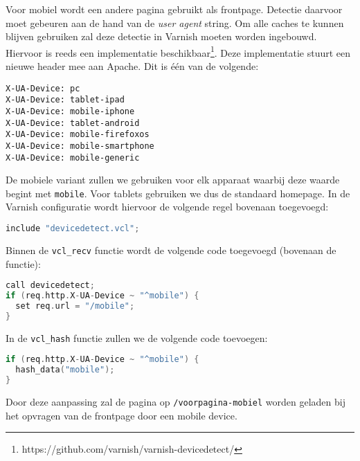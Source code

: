 Voor mobiel wordt een andere pagina gebruikt als frontpage. Detectie daarvoor moet gebeuren aan de hand van de \emph{user agent} string. Om alle caches te kunnen blijven gebruiken zal deze detectie in Varnish moeten worden ingebouwd. Hiervoor is reeds een implementatie beschikbaar\footnote{https://github.com/varnish/varnish-devicedetect/}. Deze implementatie stuurt een nieuwe header mee aan Apache. Dit is \'{e}\'{e}n van de volgende:
\begin{verbatim}
X-UA-Device: pc
X-UA-Device: tablet-ipad
X-UA-Device: mobile-iphone
X-UA-Device: tablet-android
X-UA-Device: mobile-firefoxos
X-UA-Device: mobile-smartphone
X-UA-Device: mobile-generic
\end{verbatim}
De mobiele variant zullen we gebruiken voor elk apparaat waarbij deze waarde begint met \texttt{mobile}. Voor tablets gebruiken we dus de standaard homepage. In de Varnish configuratie wordt hiervoor de volgende regel bovenaan toegevoegd:

\begin{lstlisting}[language=C]
include "devicedetect.vcl";
\end{lstlisting}

Binnen de \texttt{vcl\_recv} functie wordt de volgende code toegevoegd (bovenaan de functie):

\begin{lstlisting}[language=C]
call devicedetect;
if (req.http.X-UA-Device ~ "^mobile") {
  set req.url = "/mobile";
}
\end{lstlisting}

In de \texttt{vcl\_hash} functie zullen we de volgende code toevoegen:

\begin{lstlisting}[language=C]
if (req.http.X-UA-Device ~ "^mobile") {
  hash_data("mobile");
}
\end{lstlisting}

Door deze aanpassing zal de pagina op \texttt{/voorpagina-mobiel} worden geladen bij het opvragen van de frontpage door een mobile device.
